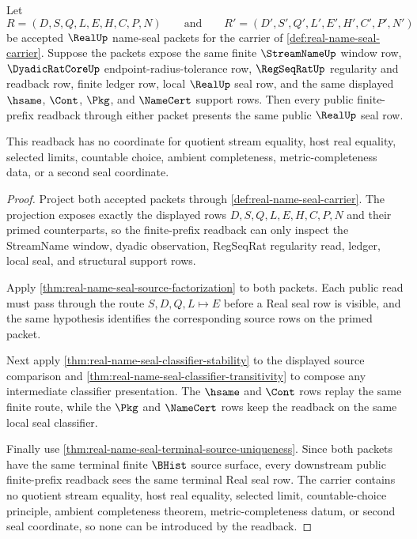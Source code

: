\begin{theorem}
\label{thm:real-finite-prefix-readback-uniqueness}
Let
$$
R=(D,S,Q,L,E,H,C,P,N)
\qquad\text{and}\qquad
R'=(D',S',Q',L',E',H',C',P',N')
$$
be accepted $\RealUp$ name-seal packets for the carrier of \autoref{def:real-name-seal-carrier}. Suppose the packets expose the same finite $\StreamNameUp$ window row, $\DyadicRatCoreUp$ endpoint-radius-tolerance row, $\RegSeqRatUp$ regularity and readback row, finite ledger row, local $\RealUp$ seal row, and the same displayed $\hsame$, $\Cont$, $\Pkg$, and $\NameCert$ support rows. Then every public finite-prefix readback through either packet presents the same public $\RealUp$ seal row.

This readback has no coordinate for quotient stream equality, host real equality, selected limits, countable choice, ambient completeness, metric-completeness data, or a second seal coordinate.
\end{theorem}
\begin{proof}
Project both accepted packets through \autoref{def:real-name-seal-carrier}. The projection exposes exactly the displayed rows $D,S,Q,L,E,H,C,P,N$ and their primed counterparts, so the finite-prefix readback can only inspect the StreamName window, dyadic observation, RegSeqRat regularity read, ledger, local seal, and structural support rows.

Apply \autoref{thm:real-name-seal-source-factorization} to both packets. Each public read must pass through the route $S,D,Q,L \longmapsto E$ before a Real seal row is visible, and the same hypothesis identifies the corresponding source rows on the primed packet.

Next apply \autoref{thm:real-name-seal-classifier-stability} to the displayed source comparison and \autoref{thm:real-name-seal-classifier-transitivity} to compose any intermediate classifier presentation. The $\hsame$ and $\Cont$ rows replay the same finite route, while the $\Pkg$ and $\NameCert$ rows keep the readback on the same local seal classifier.

Finally use \autoref{thm:real-name-seal-terminal-source-uniqueness}. Since both packets have the same terminal finite $\BHist$ source surface, every downstream public finite-prefix readback sees the same terminal Real seal row. The carrier contains no quotient stream equality, host real equality, selected limit, countable-choice principle, ambient completeness theorem, metric-completeness datum, or second seal coordinate, so none can be introduced by the readback.
\end{proof}

